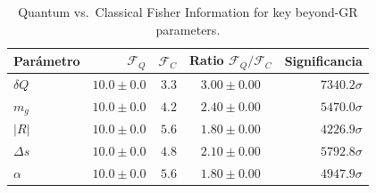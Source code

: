 \begin{table}[ht]
\centering
\caption{Quantum vs.\ Classical Fisher Information for key beyond-GR parameters.}
\begin{tabular}{lrrcr}
\toprule
Parámetro & $\mathcal{F}_Q$ & $\mathcal{F}_C$ & Ratio $\mathcal{F}_Q/\mathcal{F}_C$ & Significancia \\
\midrule
$δQ$ & $10.0\pm0.0$ & $3.3$ & $3.00\pm0.00$ & $7340.2\sigma$ \\
$m_g$ & $10.0\pm0.0$ & $4.2$ & $2.40\pm0.00$ & $5470.0\sigma$ \\
$|R|$ & $10.0\pm0.0$ & $5.6$ & $1.80\pm0.00$ & $4226.9\sigma$ \\
$Δs$ & $10.0\pm0.0$ & $4.8$ & $2.10\pm0.00$ & $5792.8\sigma$ \\
$α$ & $10.0\pm0.0$ & $5.6$ & $1.80\pm0.00$ & $4947.9\sigma$ \\
\bottomrule
\end{tabular}
\end{table}